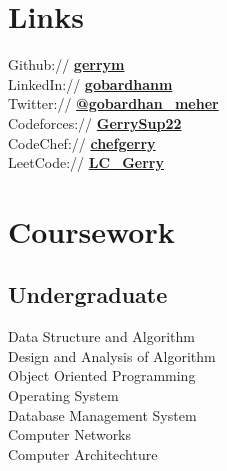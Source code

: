 \documentclass[]{deedy-resume-openfont}
\begin{document}
\begin{minipage}[t]{0.33\textwidth}
\section{Links} 
Github:// \href{https://github.com/gerry2206}{\bf gerrym} \\
LinkedIn://  \href{https://www.linkedin.com/in/gerrymeher}{\bf gobardhanm} \\
Twitter://  \href{https://twitter.com/me_gerry22}{\bf @gobardhan\_meher} \\
Codeforces:// \href{https://codeforces.com/profile/GerrySup22}{\bf GerrySup22} \\
CodeChef:// \href{https://www.codechef.com/users/ditu_22}{\bf chefgerry} \\
LeetCode:// \href{https://leetcode.com/ditu22/}{\bf LC\_Gerry}

\section{Coursework}

 \subsection{Undergraduate}
Data Structure and Algorithm \\
Design and Analysis of Algorithm \\
Object Oriented Programming \\
Operating System \\
Database Management System \\
Computer Networks \\
Computer Architechture 


\end{minipage}
\end{document}
